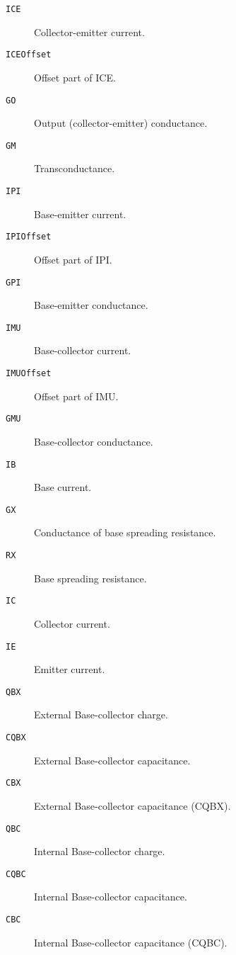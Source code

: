 \begin{description}
\item[{\tt ICE}] Collector-emitter current.

\item[{\tt ICEOffset}] Offset part of ICE.

\item[{\tt GO}] Output (collector-emitter) conductance.

\item[{\tt GM}] Transconductance.

\item[{\tt IPI}] Base-emitter current.

\item[{\tt IPIOffset}] Offset part of IPI.

\item[{\tt GPI}] Base-emitter conductance.

\item[{\tt IMU}] Base-collector current.

\item[{\tt IMUOffset}] Offset part of IMU.

\item[{\tt GMU}] Base-collector conductance.

\item[{\tt IB}] Base current.

\item[{\tt GX}] Conductance of base spreading resistance.

\item[{\tt RX}] Base spreading resistance.

\item[{\tt IC}] Collector current.

\item[{\tt IE}] Emitter current.

\item[{\tt QBX}] External Base-collector charge.

\item[{\tt CQBX}] External Base-collector capacitance.

\item[{\tt CBX}] External Base-collector capacitance (CQBX).

\item[{\tt QBC}] Internal Base-collector charge.

\item[{\tt CQBC}] Internal Base-collector capacitance.

\item[{\tt CBC}] Internal Base-collector capacitance (CQBC).


\end{description}
